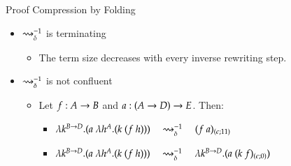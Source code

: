 \documentclass[9pt]{beamer}
\newcommand{\mypause}{\pause}
\begin{document}

\begin{frame}{Proof Compression by Folding}
\begin{itemize}
\item $\rightsquigarrow_{\delta}^{-1}$ is terminating
\begin{itemize}
	\item The term size decreases with every inverse rewriting step.
\end{itemize}
\mypause
\item $\rightsquigarrow_{\delta}^{-1}$ is not confluent
\begin{itemize}
	\item Let $f: A\rightarrow B$ and $a: (A \rightarrow D) \rightarrow E$. Then: 
	\begin{itemize}
		\item $\lambda k^{B \rightarrow D}. (a \ \lambda h^A.(k \ (f \ h))) \quad \rightsquigarrow_{\delta}^{-1} \quad (f \ a)_{(\epsilon ; 11)}$
		\item $\lambda k^{B \imp D}. (a \ \lambda h^A.(k \ (f \ h))) \quad \unfold^{-1} \quad \lambda k^{B \imp D}. (a \ (k \ f)_{(\eS ; 0)})$
	\end{itemize}
\end{itemize}
\end{itemize}
\end{frame}
\end{document}
